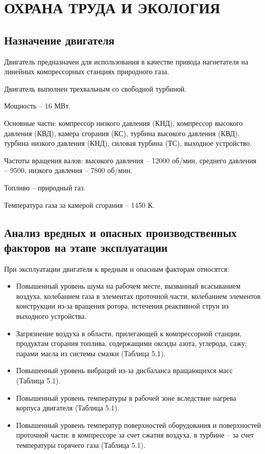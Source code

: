 \section{ОХРАНА ТРУДА И ЭКОЛОГИЯ}
\label{sec:ecology}

\subsection{Назначение двигателя}
\label{sub:ecology_engine_purpose}

Двигатель предназначен для использования в качестве привода нагнетателя на линейных компрессорных станциях природного газа.

Двигатель выполнен трехвальным со свободной турбиной.

Мощность – 16 МВт.

Основные части: компрессор низкого давления (КНД), компрессор высокого давления (КВД), камера сгорания (КС), турбина высокого давления (КВД), турбина низкого давления (КНД), силовая турбина (ТС), выходное устройство.

Частоты вращения валов: высокого давления – 12000 об/мин, среднего давления – 9500, низкого давления – 7800 об/мин.

Топливо – природный газ.

Температура газа за камерой сгорания – 1450 К.

\subsection{Анализ вредных и опасных производственных факторов на этапе эксплуатации} %
\label{sub:ecology_factor_analisys}

При эксплуатации двигателя к вредным и опасным факторам относятся:
\begin{itemize}
	\item Повышенный уровень шума на рабочем месте, вызванный всасыванием воздуха, колебанием газа в элементах проточной части, колебанием элементов конструкции из-за вращения ротора, истечения реактивной струи из выходного устройства.
	\item Загрязнение воздуха в области, прилегающей к компрессорной станции, продуктам сгорания топлива, содержащими оксиды азота, углерода, сажу; парами масла из системы смазки (Таблица 5.1).
	\item Повышенный уровень вибраций из-за дисбаланса вращающихся масс (Таблица 5.1).
	\item Повышенный уровень температуры в рабочей зоне вследствие нагрева корпуса двигателя (Таблица 5.1).
	\item Повышенный уровень температур поверхностей оборудования и поверхностей проточной части: в компрессоре за счет сжатия воздуха, в турбине – за счет температуры горячего газа (Таблица 5.1).
\end{itemize}

